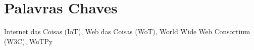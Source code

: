 \chapter{Palavras Chaves}


Internet das Coisas (IoT), Web das Coisas (WoT), World Wide Web Consortium (W3C), WoTPy

